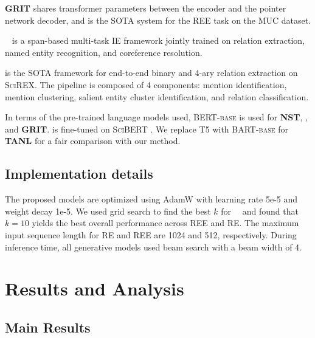 \documentclass[11pt]{article}
\begin{document}
\textbf{GRIT} \cite{du-2020-grit} shares transformer parameters between the encoder and the pointer network decoder, and is the SOTA system for the REE task on the MUC dataset. 

\textbf{\dygiepp}\ \cite{wadden-etal-2019-entity} is a span-based multi-task IE framework jointly trained on relation extraction, named entity recognition, and coreference resolution. 

\textbf{\scirexpipeline} \cite{jain-etal-2020-scirex} is the SOTA framework for end-to-end binary and 4-ary relation extraction on \textsc{SciREX}. The pipeline is composed of 4 components: mention identification, mention clustering, salient entity cluster identification, and relation classification.  

In terms of the pre-trained language models used, \textsc{BERT-base} \cite{Devlin_2019} is used for \textbf{NST}, \textbf{\dygiepp}, and \textbf{GRIT}. \textbf{\scirexpipeline} is fine-tuned on \textsc{SciBERT} \cite{beltagy-etal-2019-scibert}. We replace \textsc{T5} \cite{JMLR:v21:20-074} with \textsc{BART-base} for \textbf{TANL} for a fair comparison with our method.

\subsection{Implementation details}
The proposed models are optimized using AdamW \cite{loshchilov2018decoupled} with learning rate 5e-5 and weight decay 1e-5. We used grid search to find the best $k$ for \topkcopy \ \ and found that $k=10$ yields the best overall performance across REE and RE. The maximum input sequence length for RE and REE are 1024 and 512, respectively. During inference time, all generative models used beam search with a beam width of 4.


%
 
\section{Results and Analysis}

\subsection{Main Results} 
\end{document}
